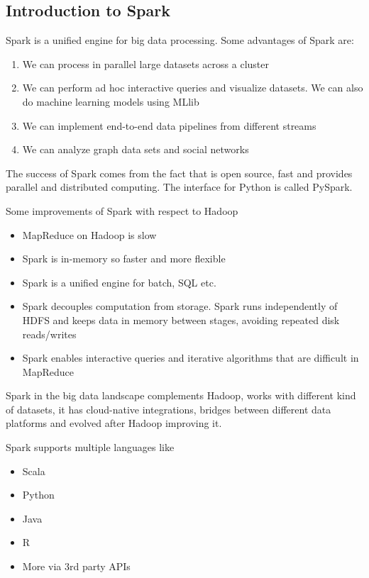 \subsection{Introduction to Spark}

Spark is a unified engine for big data processing. Some advantages of Spark are:
\begin{enumerate}
    \item We can process in parallel large datasets across a cluster
    \item We can perform ad hoc interactive queries and visualize datasets. We can also do machine learning models using MLlib
    \item We can implement end-to-end data pipelines from different streams
    \item We can analyze graph data sets and social networks
\end{enumerate}

The success of Spark comes from the fact that is open source, fast and provides parallel and distributed computing. The interface for Python is called PySpark.

Some improvements of Spark with respect to Hadoop
\begin{itemize}
    \item MapReduce on Hadoop is slow
    \item Spark is in-memory so faster and more flexible
    \item Spark is a unified engine for batch, SQL etc.
    \item Spark decouples computation from storage. Spark runs independently of HDFS and keeps data in memory between stages, avoiding repeated disk reads/writes
    \item Spark enables interactive queries and iterative algorithms that are difficult in MapReduce
\end{itemize}

Spark in the big data landscape complements Hadoop, works with different kind of datasets, it has cloud-native integrations, bridges between different data platforms and evolved after Hadoop improving it.

\vspace{10pt}

Spark supports multiple languages like

\begin{itemize}
    \item Scala
    \item Python
    \item Java
    \item R
    \item More via 3rd party APIs
\end{itemize}

